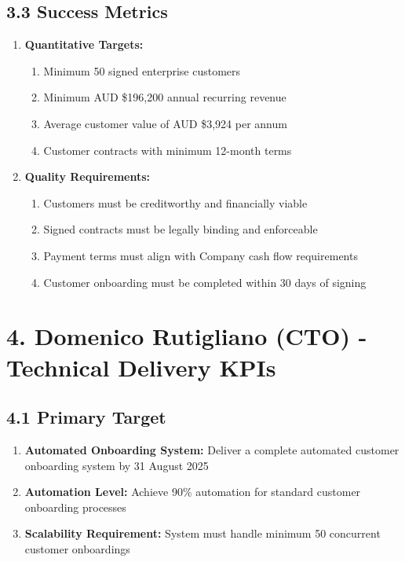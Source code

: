 \subsection*{3.3 Success Metrics}
\begin{enumerate}[label=\arabic*.]
\item \textbf{Quantitative Targets:}
    \begin{enumerate}[label=(\alph*)]
    \item Minimum 50 signed enterprise customers
    \item Minimum AUD \$196,200 annual recurring revenue
    \item Average customer value of AUD \$3,924 per annum
    \item Customer contracts with minimum 12-month terms
    \end{enumerate}

\item \textbf{Quality Requirements:}
    \begin{enumerate}[label=(\alph*)]
    \item Customers must be creditworthy and financially viable
    \item Signed contracts must be legally binding and enforceable
    \item Payment terms must align with Company cash flow requirements
    \item Customer onboarding must be completed within 30 days of signing
    \end{enumerate}
\end{enumerate}

\section*{4. Domenico Rutigliano (CTO) - Technical Delivery KPIs}

\subsection*{4.1 Primary Target}
\begin{enumerate}[label=\arabic*.]
\item \textbf{Automated Onboarding System:} Deliver a complete automated customer onboarding system by 31 August 2025
\item \textbf{Automation Level:} Achieve 90\% automation for standard customer onboarding processes
\item \textbf{Scalability Requirement:} System must handle minimum 50 concurrent customer onboardings
\end{enumerate}

